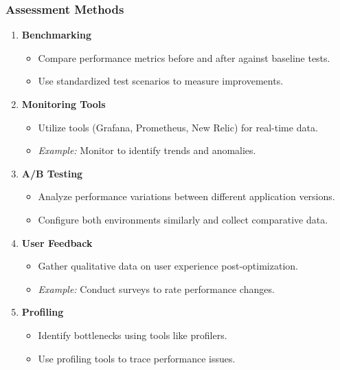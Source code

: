 \documentclass[aspectratio=169]{beamer}
\begin{document}
\begin{frame}[fragile]
    \frametitle{Assessment Methods}
    \begin{enumerate}
        \item \textbf{Benchmarking}
            \begin{itemize}
                \item Compare performance metrics before and after against baseline tests.
                \item Use standardized test scenarios to measure improvements.
            \end{itemize}
        
        \item \textbf{Monitoring Tools}
            \begin{itemize}
                \item Utilize tools (Grafana, Prometheus, New Relic) for real-time data.
                \item \textit{Example:} Monitor to identify trends and anomalies.
            \end{itemize}

        \item \textbf{A/B Testing}
            \begin{itemize}
                \item Analyze performance variations between different application versions.
                \item Configure both environments similarly and collect comparative data.
            \end{itemize}

        \item \textbf{User Feedback}
            \begin{itemize}
                \item Gather qualitative data on user experience post-optimization.
                \item \textit{Example:} Conduct surveys to rate performance changes.
            \end{itemize}

        \item \textbf{Profiling}
            \begin{itemize}
                \item Identify bottlenecks using tools like profilers.
                \item Use profiling tools to trace performance issues.
            \end{itemize}
    \end{enumerate}
\end{frame}
\end{document}
